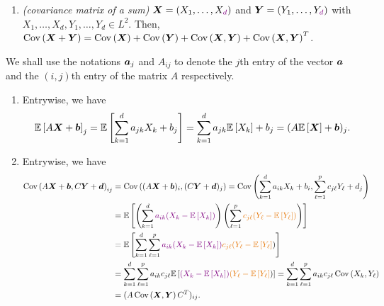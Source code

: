 \begin{enumerate}
\begin{enumerate}
\item\label{it:cov-sums} \emph{(covariance matrix of a sum)} \(\vect{X}=(X_1,\dotsc,X_{\vc{d}})\)
and \(\vect{Y}=(Y_1,\dotsc,Y_{\vc{d}})\) with
\(X_1,\dotsc,X_d,Y_1,\dotsc,Y_d\in L^{2}\). Then,
\(\operatorname{Cov}\left(\bm{X}+\bm{Y}\right)=\operatorname{Cov}\left(\bm{X}\right)+\operatorname{Cov}\left(\bm{Y}\right)
+\operatorname{Cov}\left(\bm{X},\bm{Y}\right)+\operatorname{Cov}\left(\bm{X},\bm{Y}\right)^{T}\).
\end{enumerate}
\begin{pf}
We shall use the notations \(\bm{a}_j\) and \(A_{ij}\) to denote the \(j\)th
entry of the vector \(\bm{a}\) and the \((i,j)\)th entry of the matrix \(A\)
respectively.
\begin{enumerate}
\item Entrywise, we have
\[
\mathbb{E}\left[A\bm{X}+\bm{b}\right]_{j}=\mathbb{E}\left[\sum_{k=1}^{d}a_{jk}X_k+b_j\right]
=\sum_{k=1}^{d}a_{jk}\mathbb{E}\left[X_k\right]+b_j
=(A\mathbb{E}\left[\bm{X}\right]+\bm{b})_{j}.
\]
\item Entrywise, we have
\begin{align*}
\cov{A\vect{X}+\vect{b},C\vect{Y}+\vect{d}}_{ij}
&=\cov{(A\vect{X}+\vect{b})_{i},(C\vect{Y}+\vect{d})_{j}}
=\cov{\sum_{k=1}^{d}a_{ik}X_k+b_i,\sum_{\ell=1}^{p}c_{j\ell}Y_{\ell}+d_j} \\
&=\expv{\left(\sum_{k=1}^{d}\vc{a_{ik}(X_k-\expv{X_k})}\right)
\left(\sum_{\ell=1}^{p}\orc{c_{j\ell}(Y_{\ell}-\expv{Y_{\ell}})}\right)} \\
&=\expv{\sum_{k=1}^{d}\sum_{\ell=1}^{p}\vc{a_{ik}(X_k-\expv{X_k})}
\orc{c_{j\ell}(Y_{\ell}-\expv{Y_{\ell}}})} \\
&=\sum_{k=1}^{d}\sum_{\ell=1}^{p}a_{ik}c_{j\ell}
\expv{\vc{(X_k-\expv{X_k})}\orc{(Y_{\ell}-\expv{Y_{\ell}}})}
=\sum_{k=1}^{d}\sum_{\ell=1}^{p}a_{ik}c_{j\ell}\cov{X_k,Y_{\ell}} \\
&=(A\cov{\vect{X},\vect{Y}}C^{T})_{ij}.
\end{align*}


\end{enumerate}
\end{pf}
\end{enumerate}

